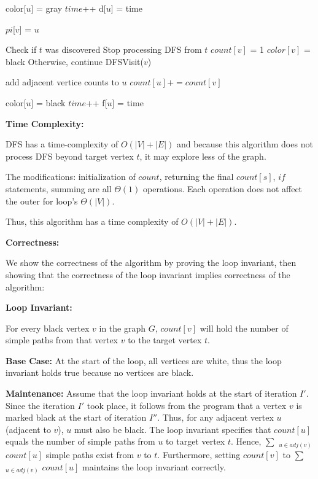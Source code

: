 \documentclass[a4paper]{report}
\begin{document}
\begin{enumerate}
    \begin{algorithmic}[1]
      \State color[$u$] = gray
      \State $time$++
      \State d[$u$] = time

          \State $pi$[$v$] = $u$


          \Comment Check if $t$ was discovered
            \Comment Stop processing DFS from $t$ 
            \State $count[v]$ = 1
            \State $color[v]$ = black
          \Else
            \Comment Otherwise, continue
            \State DFSVisit($v$)
          \EndIf
        \EndIf

        \Comment add adjacent vertice counts to $u$
        \State $count[u] += count[v]$
      \EndFor

      \State color[$u$] = black
      \State $time$++
      \State f[$u$] = time
    \EndFunction
    \end{algorithmic}

    {\bf Time Complexity:}

    DFS has a time-complexity of $O(|V| + |E|)$ and because this algorithm does not process DFS beyond target vertex $t$, it 
    may explore less of the graph. 

    The modifications: initialization of $count$, returning the final $count[s]$, $if$ statements, summing are all 
    $\Theta(1)$ operations. Each operation does not affect the outer for loop's $\Theta(|V|)$.

    Thus, this algorithm has a time complexity of $O(|V| + |E|)$.

    {\bf Correctness:}

    We show the correctness of the algorithm by proving the loop invariant, then showing that the correctness of the loop
    invariant implies correctness of the algorithm:

    {\bf Loop Invariant:}

    For every black vertex $v$ in the graph $G$, $count[v]$ will hold the number of simple paths from that vertex $v$ to the target 
    vertex $t$. 

    {\bf Base Case:}
    At the start of the loop, all vertices are white, thus the loop invariant holds true because no vertices are black. 

    {\bf Maintenance:}
    Assume that the loop invariant holds at the start of iteration $I'$. Since the iteration $I'$ took place, it follows 
    from the program that a vertex $v$ is marked black at the start of iteration $I''$. 
    Thus, for any adjacent vertex $u$ (adjacent to $v$), $u$ must also be black. The loop invariant specifies that $count[u]$ equals 
    the number of simple paths from $u$ to target vertex $t$. Hence, $\sum$ $_{u\in adj(v)}$ $count[u]$ simple paths 
    exist from $v$ to $t$. Furthermore, setting $count[v]$ to $\sum$ $_{u\in adj(v)}$ $count[u]$ maintains the loop invariant 
    correctly. 


\end{enumerate}
\end{document}
